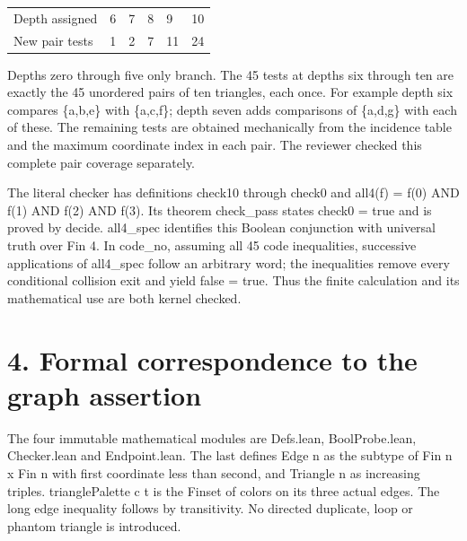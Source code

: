 \documentclass[10pt]{article}
\begin{document}
\begin{tabular}{llllll}
Depth assigned & 6 & 7 & 8 & 9 & 10 \\
New pair tests & 1 & 2 & 7 & 11 & 24 \\
\end{tabular}\par\medskip
Depths zero through five only branch. The 45 tests at depths six through ten are exactly the 45 unordered pairs of ten triangles, each once. For example depth six compares \{a,b,e\} with \{a,c,f\}; depth seven adds comparisons of \{a,d,g\} with each of these. The remaining tests are obtained mechanically from the incidence table and the maximum coordinate index in each pair. The reviewer checked this complete pair coverage separately.


The literal checker has definitions check10 through check0 and all4(f) = f(0) AND f(1) AND f(2) AND f(3). Its theorem check\_pass states check0 = true and is proved by decide. all4\_spec identifies this Boolean conjunction with universal truth over Fin 4. In code\_no, assuming all 45 code inequalities, successive applications of all4\_spec follow an arbitrary word; the inequalities remove every conditional collision exit and yield false = true. Thus the finite calculation and its mathematical use are both kernel checked.


\clearpage
\section*{4. Formal correspondence to the graph assertion}
The four immutable mathematical modules are Defs.lean, BoolProbe.lean, Checker.lean and Endpoint.lean. The last defines Edge n as the subtype of Fin n x Fin n with first coordinate less than second, and Triangle n as increasing triples. trianglePalette c t is the Finset of colors on its three actual edges. The long edge inequality follows by transitivity. No directed duplicate, loop or phantom triangle is introduced.
\end{document}
